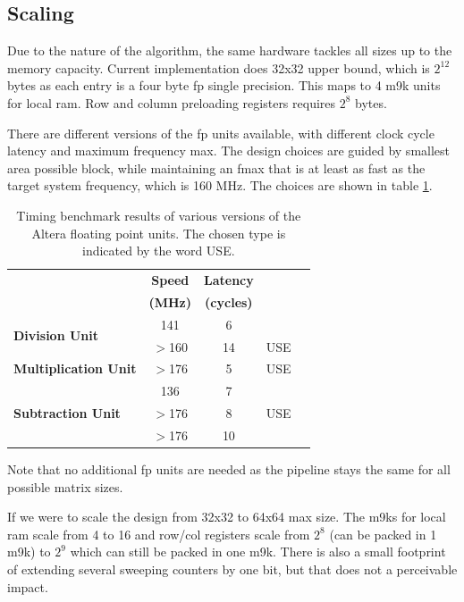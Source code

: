 \documentclass[]{article}
\begin{document}
\subsection{Scaling} %
\label{sub:scaling}

Due to the nature of the algorithm, the same hardware tackles all sizes up to the memory capacity. Current implementation does 32x32 upper bound, which is $2^{12}$ bytes as each entry is a four byte fp single precision. This maps to 4 m9k units for local ram. Row and column preloading registers requires $2^8$ bytes.

There are different versions of the fp units available, with different clock cycle latency and maximum frequency max. The design choices are guided by smallest area possible block, while maintaining an fmax that is at least as fast as the target system frequency, which is 160 MHz. The choices are shown in table \ref{tab:fp_unit_bench}.


\begin{table}[tbp]
	\caption{Timing benchmark results of various versions of the Altera floating point units. The chosen type is indicated by the word USE.}
	\label{tab:fp_unit_bench}
	\begin{center}
		\begin{tabular}{l|cccc}
		\hline

		\hline
			& \textbf{Speed} 	& \textbf{Latency} 		& \\
			& \textbf{(MHz)}		& \textbf{(cycles)} & \\
		\hline
			\multirow{2}{*}{\textbf{Division Unit}}
			& 141		& 6 	&  \\
			& $>$160 	& 14 	& USE \\
		\hline
			\textbf{Multiplication Unit}
			& $>$176 	& 5 	& USE \\
		\hline
			\multirow{3}{*}{\textbf{Subtraction Unit}}
			& 136 		& 7 	& \\
			& $>$176 	& 8  	& USE \\
			& $>$176 	& 10 	& \\
		\hline

		\hline
		\end{tabular}
	\end{center}
\end{table}


Note that no additional fp units are needed as the pipeline stays the same for all possible matrix sizes.

If we were to scale the design from 32x32 to 64x64 max size. The m9ks for local ram scale from 4 to 16 and row/col registers scale from $2^8$ (can be packed in 1 m9k) to $2^9$ which can still be packed in one m9k. There is also a small footprint of extending several sweeping counters by one bit, but that does not a perceivable impact.
\end{document}
